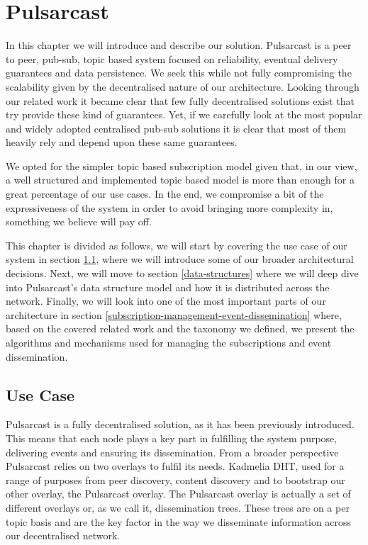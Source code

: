 
\chapter{Pulsarcast}
\label{chapter:pulsarcast}

In this chapter we will introduce and describe our solution. Pulsarcast is a
peer to peer, pub-sub, topic based system focused on reliability, eventual
delivery guarantees and data persistence. We seek this while not fully
compromising the scalability given by the decentralised nature of our
architecture. Looking through our related work it became clear that few fully
decentralised solutions exist that try provide these kind of guarantees. Yet,
if we carefully look at the most popular and widely adopted centralised pub-sub
solutions it is clear that most of them heavily rely and depend upon these same
guarantees. 

We opted for the simpler topic based subscription model given that, in our
view, a well structured and implemented topic based model is more than enough
for a great percentage of our use cases. In the end, we compromise a bit of the
expressiveness of the system in order to avoid bringing more complexity in,
something we believe will pay off.

This chapter is divided as follows, we will start by covering the use case of
our system in section \ref{use-case}, where we will introduce some of our
broader architectural decisions. Next, we will move to section
\ref{data-structures} where we will deep dive into Pulsarcast's data structure
model and how it is distributed across the network. Finally, we will look into
one of the most important parts of our architecture in section
\ref{subscription-management-event-dissemination} where, based on the covered
related work and the taxonomy we defined, we present the algorithms and
mechanisms used for managing the subscriptions and event dissemination.

\section{Use Case}\label{use-case}

Pulsarcast is a fully decentralised solution, as it has been previously
introduced. This means that each node plays a key part in fulfilling the system
purpose, delivering events and ensuring its dissemination. From a broader
perspective Pulsarcast relies on two overlays to fulfil its needs. Kadmelia
DHT, used for a range of purposes from peer discovery, content discovery and to
bootstrap our other overlay, the Pulsarcast overlay. The Pulsarcast overlay is
actually a set of different overlays or, as we call it, dissemination trees.
These trees are on a per topic basis and are the key factor in the way we
disseminate information across our decentralised network.

